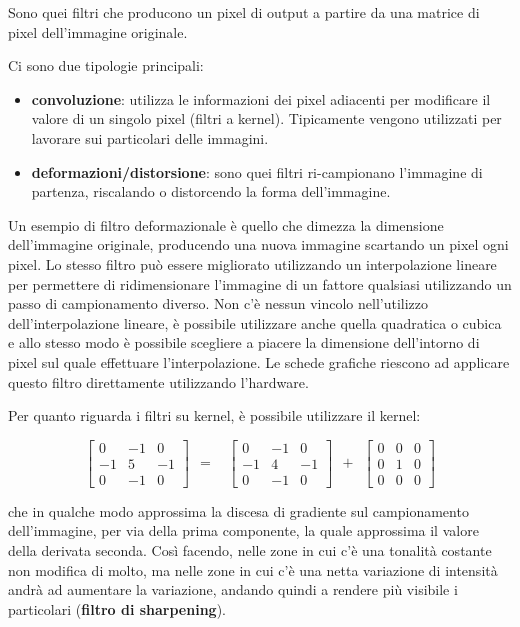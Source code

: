 Sono quei filtri che producono un pixel di output a partire da una
matrice di pixel dell'immagine originale.

Ci sono due tipologie principali:

\begin{itemize}
\tightlist
\item
  \textbf{convoluzione}: utilizza le informazioni dei pixel adiacenti
  per modificare il valore di un singolo pixel (filtri a kernel).
  Tipicamente vengono utilizzati per lavorare sui particolari delle
  immagini.
\item
  \textbf{deformazioni/distorsione}: sono quei filtri ri-campionano
  l'immagine di partenza, riscalando o distorcendo la forma
  dell'immagine.
\end{itemize}

Un esempio di filtro deformazionale è quello che dimezza la
dimensione dell'immagine originale, producendo una nuova immagine
scartando un pixel ogni pixel. Lo stesso filtro può essere migliorato
utilizzando un interpolazione lineare per permettere di ridimensionare
l'immagine di un fattore qualsiasi utilizzando un passo di campionamento
diverso. Non c'è nessun vincolo nell'utilizzo dell'interpolazione
lineare, è possibile utilizzare anche quella quadratica o cubica e allo
stesso modo è possibile scegliere a piacere la dimensione dell'intorno
di pixel sul quale effettuare l'interpolazione. Le schede grafiche
riescono ad applicare questo filtro direttamente utilizzando l'hardware.

Per quanto riguarda i filtri su kernel, è possibile utilizzare il
kernel:

\[
 \begin{bmatrix}
 0 & -1 & 0 \\
 -1 & 5 & -1 \\
 0 & -1 & 0
 \end{bmatrix}
 \:\: =\:\:\:\:
 \begin{bmatrix}
 0 & -1 & 0 \\
 -1 & 4 & -1 \\
 0 & -1 & 0
 \end{bmatrix}
 \:\: + \:\:
 \begin{bmatrix}
 0 & 0 & 0 \\
 0 & 1 & 0 \\
 0 & 0 & 0
 \end{bmatrix}
\]

che in qualche modo approssima la discesa di gradiente sul campionamento
dell'immagine, per via della prima componente, la quale approssima il
valore della derivata seconda. Così facendo, nelle zone in cui c'è una
tonalità costante non modifica di molto, ma nelle zone in cui c'è una
netta variazione di intensità andrà ad aumentare la variazione, andando
quindi a rendere più visibile i particolari (\textbf{filtro di
sharpening}).

